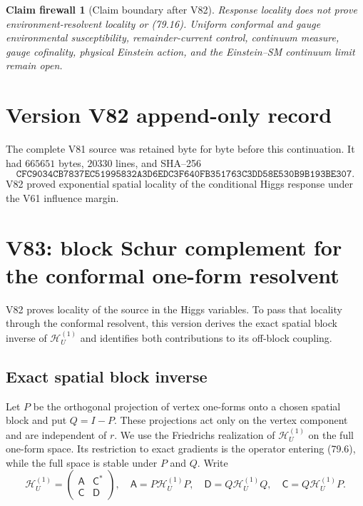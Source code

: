 \documentclass[11pt]{article}
\newtheorem{firewall}[theorem]{Claim firewall}
\theoremstyle{remark}
\begin{document}
\begin{firewall}[Claim boundary after V82]
\label{fire:v17v82}
Response locality does not prove environment-resolvent locality or
(79.16).  Uniform conformal and gauge environmental susceptibility,
remainder-current control, continuum measure, gauge cofinality,
physical Einstein action, and the Einstein--SM continuum limit remain
open.
\end{firewall}

\section*{Version V82 append-only record}
The complete V81 source was retained byte for byte before this
continuation.  It had \(665651\) bytes, \(20330\) lines, and SHA--256
\[
 \texttt{CFC9034CB7837EC51995832A3D6EDC3F640FB351763C3DD58E530B9B193BE307}.
\]
V82 proved exponential spatial locality of the conditional Higgs
response under the V61 influence margin.


\section{V83: block Schur complement for the conformal one-form resolvent}
\label{sec:v17v83}

V82 proves locality of the source in the Higgs variables.  To pass
that locality through the conformal resolvent, this version derives the
exact spatial block inverse of \(\mathscr H_U^{(1)}\) and identifies
both contributions to its off-block coupling.

\subsection{Exact spatial block inverse}

Let \(P\) be the orthogonal projection of vertex one-forms onto a
chosen spatial block and put \(Q=I-P\).  These projections act only on
the vertex component and are independent of \(r\).  We use the
Friedrichs realization of \(\mathscr H_U^{(1)}\) on the full one-form
space.  Its restriction to exact gradients is the operator entering
(79.6), while the full space is stable under \(P\) and \(Q\).  Write
\[
 \mathscr H_U^{(1)}=
 \begin{pmatrix}
  \mathsf A&\mathsf C^*\\
  \mathsf C&\mathsf D
 \end{pmatrix},
 \quad
 \mathsf A=P\mathscr H_U^{(1)}P,
 \quad
 \mathsf D=Q\mathscr H_U^{(1)}Q,
 \quad
 \mathsf C=Q\mathscr H_U^{(1)}P.                 \tag{83.1}
\]
\end{document}
